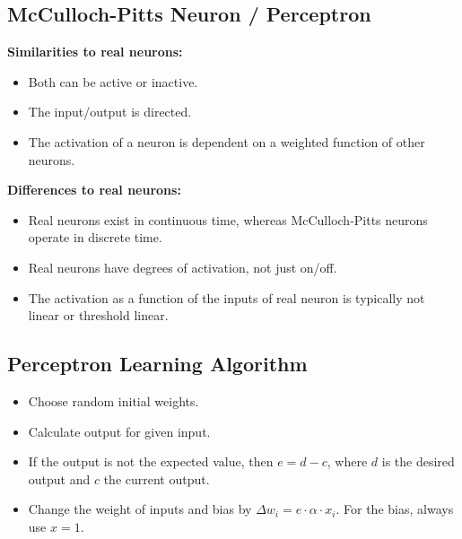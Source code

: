 \documentclass[a4paper, 12pt]{article}
\begin{document}
\subsection{McCulloch-Pitts Neuron / Perceptron}
\textbf{Similarities to real neurons:}
\begin{itemize}[noitemsep,nolistsep]
	\item Both can be active or inactive.
	\item The input/output is directed.
	\item The activation of a neuron is dependent on a weighted function of other neurons.
\end{itemize}
\textbf{Differences to real neurons:}
\begin{itemize}[noitemsep,nolistsep]
	\item Real neurons exist in continuous time, whereas McCulloch-Pitts neurons operate in discrete time.
	\item Real neurons have degrees of activation, not just on/off.
	\item The activation as a function of the inputs of real neuron is typically not linear or threshold linear.
\end{itemize}

\subsection{Perceptron Learning Algorithm}
\begin{itemize}[noitemsep,nolistsep]
	\item Choose random initial weights.
	\item Calculate output for given input.
	\item If the output is not the expected value, then $e=d-c$, where $d$ is the desired output and $c$ the current output.
	\item Change the weight of inputs and bias by $\Delta w_i=e\cdot\alpha\cdot x_i$. For the bias, always use $x=1$.
\end{itemize}
\end{document}
